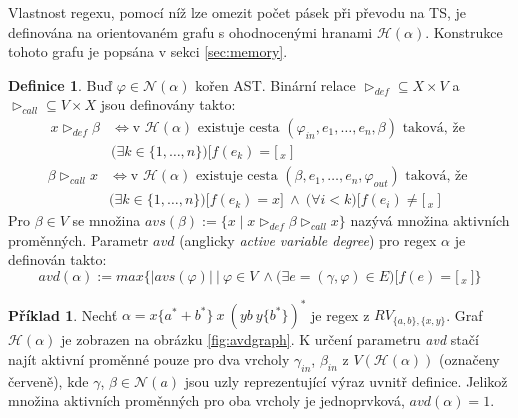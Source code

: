 \documentclass[thesis=B,czech]{FITthesis}[2019/12/23]
\theoremstyle{definition}
\newtheorem{definition}{Definice}[chapter]
\newtheorem{example}{Příklad}[chapter]
\begin{document}
Vlastnost regexu, pomocí níž lze omezit počet pásek při převodu na TS, je definována na orientovaném grafu s ohodnocenými hranami $\mathcal{H}(\alpha)$. Konstrukce tohoto grafu je popsána v sekci \ref{sec:memory}.

\begin{definition}
Buď $\varphi \in \mathcal{N}(\alpha)$ kořen AST. Binární relace $\triangleright_{def} \subseteq X \times V$ a $\triangleright_{call} \subseteq V \times X$ jsou definovány takto:
\begin{equation}\begin{split} x \triangleright_{def} \beta &\iff \text{v $\mathcal{H}(\alpha)$ existuje cesta }  (\varphi_{in}, e_1, \dots, e_n, \beta) \text{ taková, že } \\ &\bigg(\exists k \in \{1, \dots, n\}\bigg) \bigg [ f(e_k)=[\,_x \ \bigg] \end{split}\end{equation}
\begin{equation}\begin{split} \beta \triangleright_{call} x &\iff \text{v $\mathcal{H}(\alpha)$ existuje cesta }  (\beta, e_1, \dots, e_n, \varphi_{out}) \text{ taková, že } \\ &\bigg(\exists k \in \{1, \dots, n\}\bigg) \bigg [ f(e_k)=x \bigg ] \ \wedge \ \bigg(\forall i < k\bigg) \bigg[ f(e_i)\ne [\,_x \ \bigg] \end{split}\end{equation}
Pro $\beta \in V$ se množina $avs(\beta):=\{x \mid x \triangleright_{def} \beta \triangleright_{call} x\}$ nazývá množina aktivních proměnných. 
Parametr $avd$ (anglicky \emph{active variable degree}) pro regex $\alpha$ je definován takto:
\begin{equation} avd(\alpha) := max\bigg\{|avs(\varphi)| \ \bigg | \ \varphi \in V \ \wedge \bigg (
\exists e = (\gamma, \varphi) \in E \bigg ) \bigg [ f(e)=[\,_x \ \bigg] \bigg\}\end{equation}
\end{definition}

\begin{example} Nechť $\alpha = x\{a^\ast+b^\ast\} \ x \ (yb \ y \{b^\ast\})^\ast$ je regex z $RV_{\{a, b\},\{x, y\}}$. Graf $\mathcal{H}(\alpha)$ je zobrazen na obrázku \ref{fig:avdgraph}. K určení parametru \emph{avd} stačí najít aktivní proměnné pouze pro dva vrcholy $\gamma_{in}$, $\beta_{in}$ z $V(\mathcal{H}(\alpha))$ (označeny červeně), kde $\gamma$, $\beta \in \mathcal{N}(a)$ jsou uzly reprezentující výraz uvnitř definice. Jelikož množina aktivních proměnných pro oba vrcholy je jednoprvková, $avd(\alpha) = 1$.
\end{example}
\end{document}
